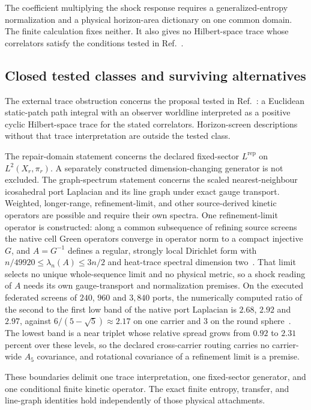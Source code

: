 \documentclass[11pt]{article}
\theoremstyle{remark}
\begin{document}
The coefficient multiplying the shock response requires a generalized-entropy
normalization and a physical horizon-area dictionary on one common domain.
The finite calculation fixes neither. It also gives no Hilbert-space trace
whose correlators satisfy the conditions tested in
Ref.~\cite{chenStanfordTangYang2026}.

\subsection*{Closed tested classes and surviving alternatives}

The external trace obstruction concerns the proposal tested in
Ref.~\cite{chenStanfordTangYang2026}: a Euclidean static-patch path integral
with an observer worldline interpreted as a positive cyclic Hilbert-space
trace for the stated correlators. Horizon-screen descriptions without that
trace interpretation are outside the tested class.

The repair-domain statement concerns the declared fixed-sector
\(L^{\mathrm{rep}}\) on \(L^2(X_r,\pi_r)\). A separately constructed
dimension-changing generator is not excluded. The graph-spectrum statement
concerns the scaled nearest-neighbour icosahedral port Laplacian and its line
graph under exact gauge transport. Weighted, longer-range, refinement-limit,
and other source-derived kinetic operators are possible and require their
own spectra. One refinement-limit operator is constructed: along a common
subsequence of refining source screens the native cell Green operators
converge in operator norm to a compact injective \(G\), and \(A=G^{-1}\)
defines a regular, strongly local Dirichlet form with
\(n/49920\le\lambda_n(A)\le3n/2\) and heat-trace spectral dimension
two~\cite{ophcontinuum}. That limit selects no unique whole-sequence limit and
no physical metric, so a shock reading of \(A\) needs its own gauge-transport
and normalization premises. On the executed federated screens of \(240\), \(960\) and
\(3{,}840\) ports, the numerically computed ratio of the second to the first
low band of the native port Laplacian is \(2.68\), \(2.92\) and \(2.97\),
against \(6/(5-\sqrt5)\approx2.17\) on one carrier and \(3\) on the round
sphere~\cite{ophfedscaling}. The lowest band is a near triplet whose relative
spread grows from \(0.92\) to \(2.31\) percent over these levels, so the
declared cross-carrier routing carries no carrier-wide \(A_5\) covariance,
and rotational covariance of a refinement limit is a premise.

These boundaries delimit one trace interpretation, one fixed-sector
generator, and one conditional finite kinetic operator. The exact finite
entropy, transfer, and line-graph identities hold independently of those
physical attachments.
\end{document}
